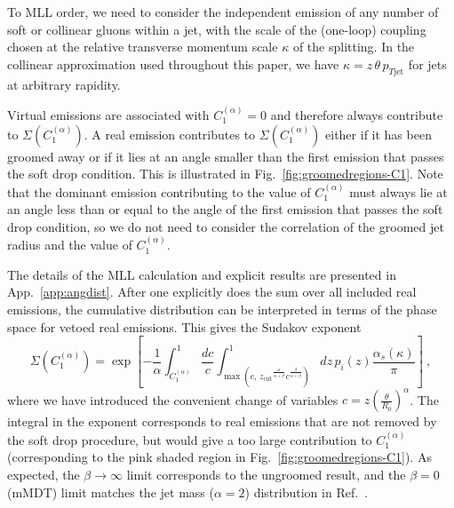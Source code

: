 \documentclass[letterpaper,11pt]{article}
\newcommand{\as}{\alpha_s}
\newcommand{\C}[2]{C^{(#2)}_{#1}}
\newcommand{\zcut}{z_\text{cut}}
\newcommand{\ea}{{\C{1}{\alpha}}}
\DeclareRobustCommand{\App}[1]{App.~\ref{#1}}
\DeclareRobustCommand{\Fig}[1]{Fig.~\ref{#1}}
\DeclareRobustCommand{\Ref}[1]{Ref.~\cite{#1}}
\begin{document}
To MLL order, we need to consider the independent emission of any number of soft or collinear gluons within a jet, with the scale of the (one-loop) coupling chosen at the relative transverse momentum scale $\kappa$ of the splitting.  In the collinear approximation used throughout this paper, we have $\kappa = z \, \theta \, p_{T \text{jet}}$ for jets at arbitrary rapidity.

Virtual emissions are associated with $\ea = 0$ and therefore always contribute to $\Sigma(\ea)$.  A real emission contributes to $\Sigma(\ea)$ either if it has been groomed away or if it lies at an angle smaller than the first emission that passes the soft drop condition.  This is illustrated in \Fig{fig:groomedregions-C1}.  Note that the dominant emission contributing to the value of $\ea$ must always lie at an angle less than or equal to the angle of the first emission that passes the soft drop condition, so we do not need to consider the correlation of the groomed jet radius and the value of $\ea$. 


The details of the MLL calculation and explicit results are presented in \App{app:angdist}.  After one explicitly does the sum over all included real emissions, the cumulative distribution can be interpreted in terms of the phase space for vetoed real emissions.  This gives the Sudakov exponent
\begin{equation}\label{all-order-ang-end}
\Sigma(\ea)=\exp \left[- \frac{1}{\alpha}\int_{\ea}^1 \frac{d c}{c} 
\int_{\max \left(c,\, {\zcut}^\frac{\alpha}{\alpha+\beta} {c}^\frac{\beta}{\alpha+\beta} \right) }^1 d z \, p_i(z)
\frac{\as\left(\kappa  \right)}{\pi} 
\right] \ ,
\end{equation}
where we have introduced the convenient change of variables $c= z \left( \frac{\theta}{R_0}\right)^\alpha$.  The integral in the exponent corresponds to real emissions that are not removed by the soft drop procedure, but would give a too large contribution to $\ea$ (corresponding to the pink shaded region in \Fig{fig:groomedregions-C1}).  As expected, the $\beta\to \infty$ limit corresponds to the ungroomed result, and the $\beta = 0$ (mMDT) limit matches the jet mass ($\alpha = 2$) distribution in \Ref{taggersRES}.
\end{document}
